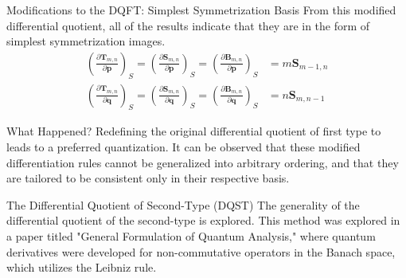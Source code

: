 \documentclass[aspectratio=169]{beamer}
\begin{document}
\begin{frame}[allowframebreaks]{Modifications to the DQFT: Simplest Symmetrization Basis}
		\framebreak
		From this modified differential quotient, all of the results indicate that they are in the form of simplest symmetrization images.
		\begin{eqnarray}
			\left( \frac{\partial\textbf{T}_{m,n}}{\partial\textbf{p}}\right)_S=\left( \frac{\partial\textbf{S}_{m,n}}{\partial\textbf{p}}\right)_S=\left( \frac{\partial\textbf{B}_{m,n}}{\partial\textbf{p}}\right)_S&=m\textbf{S}_{m-1,n}\\
			\left( \frac{\partial\textbf{T}_{m,n}}{\partial\textbf{q}}\right)_S=\left( \frac{\partial\textbf{S}_{m,n}}{\partial\textbf{q}}\right)_S=\left( \frac{\partial\textbf{B}_{m,n}}{\partial\textbf{q}}\right)_S&=n\textbf{S}_{m,n-1}
		\end{eqnarray}
		\begin{alertblock}{What Happened?}
			Redefining the original differential quotient of first type to leads to a preferred quantization. It can be observed that these modified differentiation rules cannot be generalized into arbitrary ordering, and that they are tailored to be consistent only in their respective basis.
		\end{alertblock}
	\end{frame}
	
	\begin{frame}{The Differential Quotient of Second-Type (DQST)}
		The generality of the differential quotient of the second-type is explored. This method was explored in a paper titled "General Formulation of Quantum Analysis," where quantum derivatives were developed for non-commutative operators in the Banach space, which utilizes the Leibniz rule.
	\end{frame}
	
\end{document}
